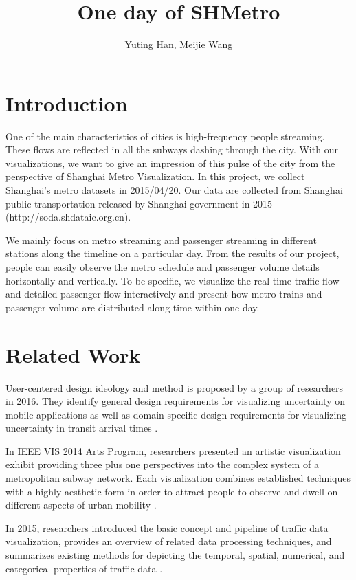 \documentclass{proc}
\begin{document}
\title{One day of SHMetro}

\author{Yuting Han, Meijie Wang}

\maketitle

\section{Introduction}
One of the main characteristics of cities is high-frequency people streaming. These flows are reflected in all the subways dashing through the city. With our visualizations, we want to give an impression of this pulse of the city from the perspective of Shanghai Metro Visualization. In this project, we collect Shanghai’s metro datasets in 2015/04/20. Our data are collected from Shanghai public transportation released by Shanghai government in 2015 (http://soda.shdataic.org.cn).  

We mainly focus on metro streaming and passenger streaming in different stations along the timeline on a particular day. From the results of our project, people can easily observe the metro schedule and passenger volume details horizontally and vertically. To be specific, we visualize the real-time traffic flow and detailed passenger flow interactively and present how metro trains and passenger volume are distributed along time within one day.


\section{Related Work}
User-centered design ideology and method is proposed by a group of researchers in 2016. They identify general design requirements for visualizing uncertainty on mobile applications as well as domain-specific design requirements for visualizing uncertainty in transit arrival times \cite{1}. 

In IEEE VIS 2014 Arts Program, researchers presented an artistic visualization exhibit providing three plus one perspectives into the complex system of a metropolitan subway network. Each visualization combines established techniques with a highly aesthetic form in order to attract people to observe and dwell on different aspects of urban mobility  \cite{2}.

In 2015, researchers introduced the basic concept and pipeline of traffic data visualization, provides an overview of related data processing techniques, and summarizes existing methods for depicting the temporal, spatial, numerical, and categorical properties of traffic data \cite{3}. 
\end{document}
